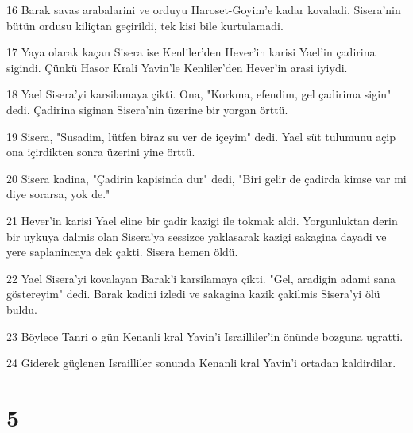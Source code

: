 \par 16 Barak savas arabalarini ve orduyu Haroset-Goyim'e kadar kovaladi. Sisera'nin bütün ordusu kiliçtan geçirildi, tek kisi bile kurtulamadi.
\par 17 Yaya olarak kaçan Sisera ise Kenliler'den Hever'in karisi Yael'in çadirina sigindi. Çünkü Hasor Krali Yavin'le Kenliler'den Hever'in arasi iyiydi.
\par 18 Yael Sisera'yi karsilamaya çikti. Ona, "Korkma, efendim, gel çadirima sigin" dedi. Çadirina siginan Sisera'nin üzerine bir yorgan örttü.
\par 19 Sisera, "Susadim, lütfen biraz su ver de içeyim" dedi. Yael süt tulumunu açip ona içirdikten sonra üzerini yine örttü.
\par 20 Sisera kadina, "Çadirin kapisinda dur" dedi, "Biri gelir de çadirda kimse var mi diye sorarsa, yok de."
\par 21 Hever'in karisi Yael eline bir çadir kazigi ile tokmak aldi. Yorgunluktan derin bir uykuya dalmis olan Sisera'ya sessizce yaklasarak kazigi sakagina dayadi ve yere saplanincaya dek çakti. Sisera hemen öldü.
\par 22 Yael Sisera'yi kovalayan Barak'i karsilamaya çikti. "Gel, aradigin adami sana göstereyim" dedi. Barak kadini izledi ve sakagina kazik çakilmis Sisera'yi ölü buldu.
\par 23 Böylece Tanri o gün Kenanli kral Yavin'i Israilliler'in önünde bozguna ugratti.
\par 24 Giderek güçlenen Israilliler sonunda Kenanli kral Yavin'i ortadan kaldirdilar.

\chapter{5}

